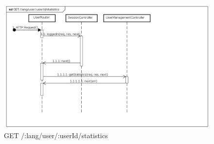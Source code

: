 \begin{itemize}
\label{Fallimento della procedura di visualizzazione delle statistiche}
\begin{figure}[ht]
	\centering
	\includegraphics[scale=0.40]{UML/DiagrammiDiSequenza/Back-end/GET_LangUserUserIdStatisticsFailure.png}
	\caption{GET /:lang/user/:userId/statistics}
\end{figure}
\FloatBarrier
\end{itemize}


